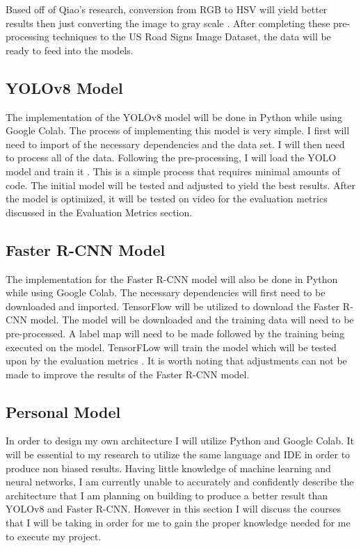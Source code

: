 \documentclass[10pt,twocolumn]{article}
\begin{document}
Based off of Qiao's research, conversion from RGB to HSV will yield better results then just converting the image to gray scale \textcite{HSV}. After completing these pre-processing techniques to the US Road Signs Image Dataset, the data will be ready to feed into the models. 

\subsection{YOLOv8 Model}
The implementation of the YOLOv8 model will be done in Python while using Google Colab. The process of implementing this model is very simple. I first will need to import of the necessary dependencies and the data set. I will then need to process all of the data. Following the pre-processing, I will load the YOLO model and train it \textcite{v8}. This is a simple process that requires minimal amounts of code. The initial model will be tested and adjusted to yield the best results. After the model is optimized, it will be tested on video for the evaluation metrics discussed in the Evaluation Metrics section. 

\subsection{Faster R-CNN Model}
The implementation for the Faster R-CNN model will also be done in Python while using Google Colab. The necessary dependencies will first need to be downloaded and imported. TensorFlow will be utilized to download the Faster R-CNN model. The model will be downloaded and the training data will need to be pre-processed. A label map will need to be made followed by the training being executed on the model. TensorFLow will train the model which will be tested upon by the evaluation metrics \textcite{R-CNN}. It is worth noting that adjustments can not be made to improve the results of the Faster R-CNN model. 

\subsection{Personal Model}
In order to design my own architecture I will utilize Python and Google Colab. It will be essential to my research to utilize the same language and IDE in order to produce non biased results. Having little knowledge of machine learning and neural networks, I am currently unable to accurately and confidently describe the architecture that I am planning on building to produce a better result than YOLOv8 and Faster R-CNN. However in this section I will discuss the courses that I will be taking in order for me to gain the proper knowledge needed for me to execute my project. 
\end{document}
